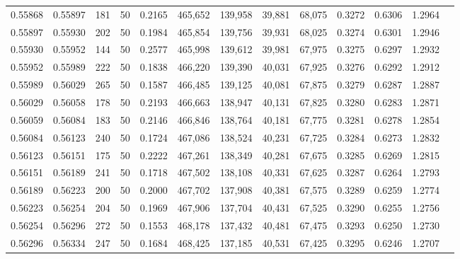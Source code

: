 \begin{tabular}{rrrrrrrrrrrrr}
0.55868 & 0.55897 &   181 &  50 &                                     0.2165 & 465,652 & 139,958 &  39,881 &  68,075 & 0.3272 & 0.6306 & 1.2964 \\
0.55897 & 0.55930 &   202 &  50 &                                     0.1984 & 465,854 & 139,756 &  39,931 &  68,025 & 0.3274 & 0.6301 & 1.2946 \\
0.55930 & 0.55952 &   144 &  50 &                                     0.2577 & 465,998 & 139,612 &  39,981 &  67,975 & 0.3275 & 0.6297 & 1.2932 \\
0.55952 & 0.55989 &   222 &  50 &                                     0.1838 & 466,220 & 139,390 &  40,031 &  67,925 & 0.3276 & 0.6292 & 1.2912 \\
0.55989 & 0.56029 &   265 &  50 &                                     0.1587 & 466,485 & 139,125 &  40,081 &  67,875 & 0.3279 & 0.6287 & 1.2887 \\
0.56029 & 0.56058 &   178 &  50 &                                     0.2193 & 466,663 & 138,947 &  40,131 &  67,825 & 0.3280 & 0.6283 & 1.2871 \\
0.56059 & 0.56084 &   183 &  50 &                                     0.2146 & 466,846 & 138,764 &  40,181 &  67,775 & 0.3281 & 0.6278 & 1.2854 \\
0.56084 & 0.56123 &   240 &  50 &                                     0.1724 & 467,086 & 138,524 &  40,231 &  67,725 & 0.3284 & 0.6273 & 1.2832 \\
0.56123 & 0.56151 &   175 &  50 &                                     0.2222 & 467,261 & 138,349 &  40,281 &  67,675 & 0.3285 & 0.6269 & 1.2815 \\
0.56151 & 0.56189 &   241 &  50 &                                     0.1718 & 467,502 & 138,108 &  40,331 &  67,625 & 0.3287 & 0.6264 & 1.2793 \\
0.56189 & 0.56223 &   200 &  50 &                                     0.2000 & 467,702 & 137,908 &  40,381 &  67,575 & 0.3289 & 0.6259 & 1.2774 \\
0.56223 & 0.56254 &   204 &  50 &                                     0.1969 & 467,906 & 137,704 &  40,431 &  67,525 & 0.3290 & 0.6255 & 1.2756 \\
0.56254 & 0.56296 &   272 &  50 &                                     0.1553 & 468,178 & 137,432 &  40,481 &  67,475 & 0.3293 & 0.6250 & 1.2730 \\
0.56296 & 0.56334 &   247 &  50 &                                     0.1684 & 468,425 & 137,185 &  40,531 &  67,425 & 0.3295 & 0.6246 & 1.2707 \\

\end{tabular}
